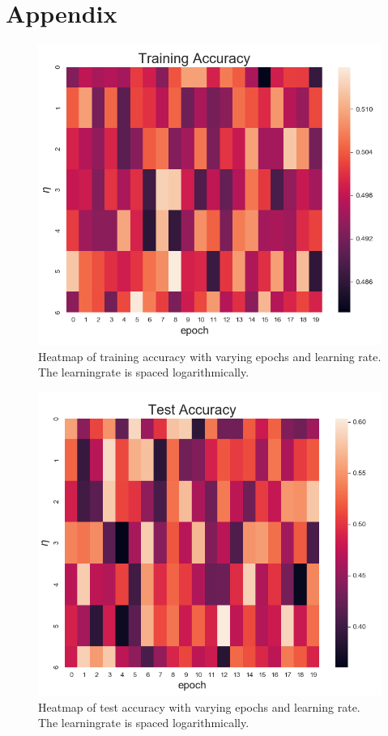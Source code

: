 \documentclass[a4paper,11pt,twocolumn]{article}
\begin{document}
\section{Appendix}

\begin{figure}[h]
\centering
\includegraphics[scale=0.75]{Heatmap1}
\caption{Heatmap of training accuracy with varying epochs and learning rate. The learningrate is spaced logarithmically.}
\label{Heatmap1}
\end{figure}

\begin{figure}[h]
\centering
\includegraphics[scale=0.75]{Heatmap2}
\caption{Heatmap of test accuracy with varying epochs and learning rate. The learningrate is spaced logarithmically.}
\label{Heatmap2}
\end{figure}
\end{document}
